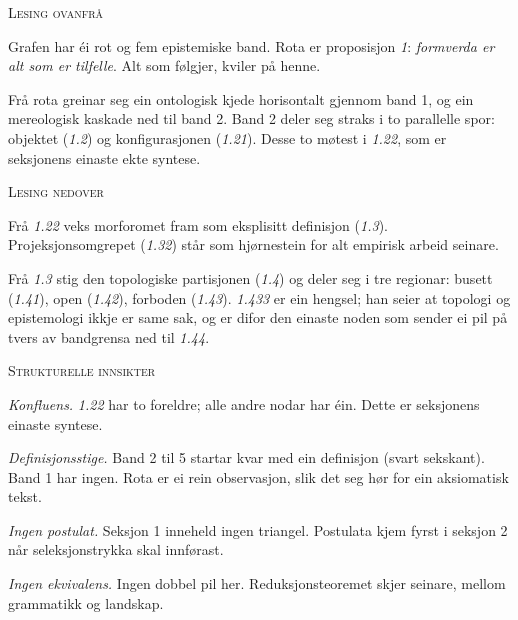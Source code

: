 \documentclass[a4paper,landscape,9pt]{article}
\begin{document}
\begin{minipage}[t]{0.325\textwidth}
{\scshape\small Lesing ovanfrå}

Grafen har éi rot og fem epistemiske band. Rota er proposisjon \emph{1}: \emph{formverda er alt som er tilfelle}. Alt som følgjer, kviler på henne.

Frå rota greinar seg ein ontologisk kjede horisontalt gjennom band 1, og ein mereologisk kaskade ned til band 2. Band 2 deler seg straks i to parallelle spor: objektet (\emph{1.2}) og konfigurasjonen (\emph{1.21}). Desse to møtest i \emph{1.22}, som er seksjonens einaste ekte syntese.
\end{minipage}\hfill
\begin{minipage}[t]{0.325\textwidth}
{\scshape\small Lesing nedover}

Frå \emph{1.22} veks morforomet fram som eksplisitt definisjon (\emph{1.3}). Projeksjonsomgrepet (\emph{1.32}) står som hjørnestein for alt empirisk arbeid seinare.

Frå \emph{1.3} stig den topologiske partisjonen (\emph{1.4}) og deler seg i tre regionar: busett (\emph{1.41}), open (\emph{1.42}), forboden (\emph{1.43}). \emph{1.433} er ein hengsel; han seier at topologi og epistemologi ikkje er same sak, og er difor den einaste noden som sender ei pil på tvers av bandgrensa ned til \emph{1.44}.
\end{minipage}\hfill
\begin{minipage}[t]{0.325\textwidth}
{\scshape\small Strukturelle innsikter}

\emph{Konfluens.} \emph{1.22} har to foreldre; alle andre nodar har éin. Dette er seksjonens einaste syntese.

\emph{Definisjonsstige.} Band 2 til 5 startar kvar med ein definisjon (svart sekskant). Band 1 har ingen. Rota er ei rein observasjon, slik det seg hør for ein aksiomatisk tekst.

\emph{Ingen postulat.} Seksjon 1 inneheld ingen triangel. Postulata kjem fyrst i seksjon 2 når seleksjonstrykka skal innførast.

\emph{Ingen ekvivalens.} Ingen dobbel pil her. Reduksjonsteoremet skjer seinare, mellom grammatikk og landskap.
\end{minipage}
\end{document}
